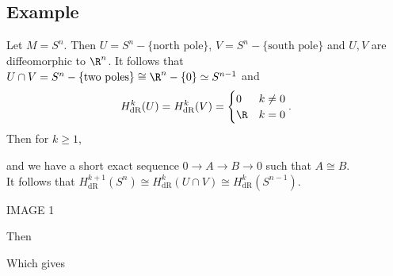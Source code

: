 \documentclass[11pt]{article}
\begin{document}
\subsection*{Example}
\label{sec:orgbde934b}
Let \(M=S^{n}\). Then \(U=S^{n}-\{\text{north pole}\}\), \(V=S^{n}-\{\text{south pole}\}\) and \(U,V\) are diffeomorphic to \(\R^{n}\). It follows that \(U\cap V=S^{n}-\{\text{two poles}\}\cong\R^{n}-\{0\}\simeq S^{n-1}\) and\\
\begin{align*}
  H_{\text{dR}}^{k}(U)=H_{\text{dR}}^{k}(V)=
  \begin{cases}
    0 & k\neq 0 \\
    \R & k=0
  \end{cases}.
\end{align*}
Then for \(k\geq 1\),\\
and we have a short exact sequence \(0\rightarrow A\rightarrow B\rightarrow 0\) such that \(A\cong B\).\\
It follows that \(H^{k+1}_{\text{dR}}(S^{n})\cong H^{k}_{\text{dR}}(U\cap V)\cong H^{k}_{\text{dR}}(S^{n-1})\).\\
\begin{center}
IMAGE 1\\
\end{center}
Then\\
Which gives\\
\end{document}
